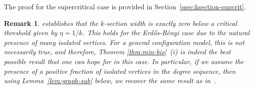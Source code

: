 \documentclass[11pt,a4paper, reqno]{article}
\numberwithin{equation}{section}
\numberwithin{equation}{section}
\newcommand{\1}{\ensuremath{\mathbbm{1}}}
\newtheorem{remark}{Remark}
\numberwithin{equation}{section}
\numberwithin{theorem}{section}
\begin{document}
The proof for the supercritical case is provided in Section~\ref{ssec:ksection-supcrit}.
\begin{remark}\label{rem:isolated-vert}\normalfont
\cite[Theorem 1]{LM01} establishes that the $k$-section width is exactly zero below a critical threshold given by $\eta = 1/k$. 
This holds for the Erd\H{o}s-R\'enyi case due to the natural presence of many isolated vertices. 
For a general configuration model, this is not necessarily true, and therefore, Theorem \ref{thm:min-bis}~(i) is indeed the best possible result that one can hope for in this case. 
In particular, if we assume the presence of a positive fraction of isolated vertices in the degree sequence, then using Lemma~\ref{lem:graph-sub} below, we recover the same result as in~\cite{LM01}. 
\end{remark}
\end{document}
